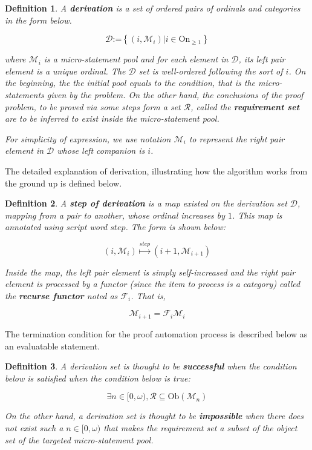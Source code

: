 \documentclass{article}
\newtheorem{definition}{Definition}	%
\numberwithin{theorem}{section}	%
\numberwithin{axiom}{section}	%
\numberwithin{definition}{section}	%
\begin{document}
\begin{definition}
	A \textbf{ derivation} is a set of ordered pairs of ordinals and categories in the form below. 
	
	\[\mathcal{D}\text{:=}\left\{\left(i,\mathcal{M}_i\right)|i\in \text{On}_{\geq 1}\right\}\]
	
	\noindent where \(\mathcal{M}_i\) { }is a micro-statement pool and for each element in \(\mathcal{D}\), its left pair element is a unique ordinal. The $\mathcal{D}$ set is well-ordered following the sort of \(i\). On the beginning, the the initial pool equals to the condition, that is the micro-statements given by the problem. On the other hand, the conclusions of the proof problem, to be proved via some steps form a set \(\mathcal{R}\), called the \textbf{requirement set} are to be inferred to exist inside the micro-statement pool.
	
	For simplicity of expression, we use notation \(\mathcal{M}_i\) to represent the right pair element in $\mathcal{D}$ { }whose left companion is \(i\).
\end{definition}

The detailed explanation of derivation, illustrating how the algorithm works from the ground up is defined below.

\begin{definition}
	A \textbf{ step of derivation} is a map existed on the derivation set \(\mathcal{D}\), mapping from a pair to another, whose ordinal increases by \(1\). This map is annotated using script word \(\mathit{s}\mathit{t}\mathit{e}\mathit{p}\). The form is shown below:
	
	\[\left(i,\mathcal{M}_i\right)\overset{\mathit{s}\mathit{t}\mathit{e}\mathit{p}}{\mapsto }\left(i+1,\mathcal{M}_{i+1}\right)\]
	
	Inside the map, the left pair element is simply self-increased and the right pair element is processed by a functor (since the item to process is a category) called the \textbf{ recurse functor} noted as \(\mathcal{F}_i\). That is,
	
	\[\mathcal{M}_{i+1}=\mathcal{F}_i\mathcal{M}_i\]
\end{definition}

The termination condition for the proof automation process is described below as an evaluatable statement. 

\begin{definition}
	A derivation set is thought to be \textbf{ successful} when the condition below is satisfied when the condition below is true:
	
	\[\exists n\in [0,\omega ), \mathcal{R}\subseteq \text{Ob}\left(\mathcal{M}_n\right)\]
	
	On the other hand, a derivation set is thought to be \textbf{ impossible} when there does not exist such a \(n\in [0,\omega )\) that makes the requirement set a subset of the object set of the targeted micro-statement pool.
\end{definition}
\end{document}
